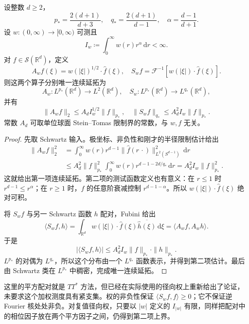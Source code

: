 \begin{proposition}[非负径向权的限制界]\label{b2:prop:24-radial-weight}
设整数 \(d\geq2\)，
\[
 p_*=\frac{2(d+1)}{d+3},\quad
 q_*=\frac{2(d+1)}{d-1},\quad
 \alpha=\frac{d-1}{d+1}.
\]
设 \(w:(0,\infty)\to[0,\infty)\) 可测且
\[
 I_w\coloneqq\int_0^\infty w(r)r^\alpha\,\mathrm dr<\infty.
\]
对 \(f\in\mathcal S(\mathbb R^d)\)，定义
\[
 A_wf(\xi)=w(|\xi|)^{1/2}\cdot\widehat f(\xi),\quad
 S_wf=\mathcal F^{-1}\!\left[w(|\xi|)\cdot\widehat f(\xi)\right].
\]
则这两个算子分别唯一连续延拓为
\[
 A_w:L^{p_*}(\mathbb R^d)\longrightarrow L^2(\mathbb R^d),\quad
 S_w:L^{p_*}(\mathbb R^d)\longrightarrow L^{q_*}(\mathbb R^d),
\]
并有
\[
 \|A_wf\|_2\leq A_d I_w^{1/2}\|f\|_{p_*},\quad
 \|S_wf\|_{q_*}\leq A_d^2 I_w\|f\|_{p_*}.
\]
常数 \(A_d\) 可取单位球面 Stein--Tomas 限制界的常数，与 \(w,f\) 无关。
\end{proposition}
\begin{proof}
先取 Schwartz 输入。极坐标、非负性和刚才的半径限制估计给出
\[
 \begin{aligned}
 \|A_wf\|_2^2
 &=\int_0^\infty w(r)r^{d-1}
       \|\widehat f(r\,\cdot)\|_{L^2(S^{d-1})}^2\,\mathrm dr\\
 &\leq A_d^2\|f\|_{p_*}^2
       \int_0^\infty w(r)r^{d-1-2d/q_*}\,\mathrm dr
 =A_d^2 I_w\|f\|_{p_*}^2.
 \end{aligned}
\]
这就给出第一项连续延拓。第二项的测试函数定义也有意义：在 \(r\leq1\) 时 \(r^{d-1}\leq r^\alpha\)；在 \(r\geq1\) 时，\(\widehat f\) 的任意阶衰减控制 \(r^{d-1-\alpha}\)。所以 \(w(|\xi|)\cdot\widehat f(\xi)\) 绝对可积。

将 \(S_wf\) 与另一 Schwartz 函数 \(h\) 配对，Fubini 给出
\[
 \langle S_wf,h\rangle
 =\int_{\mathbb R^d}w(|\xi|)\cdot
       \widehat f(\xi)\overline{\widehat h(\xi)}\,\mathrm d\xi
 =\langle A_wf,A_wh\rangle.
\]
于是
\[
 |\langle S_wf,h\rangle|
 \leq A_d^2 I_w\|f\|_{p_*}\cdot\|h\|_{p_*}.
\]
\(L^{p_*}\) 的对偶为 \(L^{q_*}\)，所以这个分布由一个 \(L^{q_*}\) 函数表示，并得到第二项估计。最后由 Schwartz 类在 \(L^{p_*}\) 中稠密，完成唯一连续延拓。
\end{proof}

这里的平方配对就是 \(TT^*\) 方法，但已经在实际使用的径向权上重新给出了论证，未要求这个加权测度具有紧支集。权的非负性保证 \(\langle S_wf,f\rangle\geq0\)；它不保证逆 Fourier 核处处非负。对复值径向权，只要以 \(|w|\) 定义的 \(I_{|w|}\) 有限，同样把配对中的相位因子放在两个平方因子之间，仍得到第二项上界。


